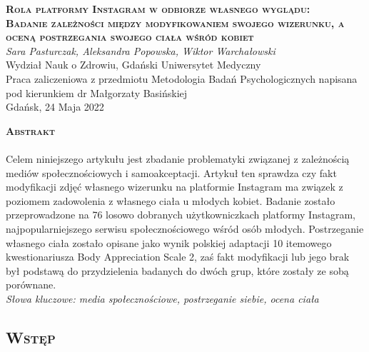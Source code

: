\documentclass[12pt,a4paper,final,oneside,onecolumn,titlepage]{article}
\begin{document}
\pagestyle{fancy}
\fancyhead{}
\fancyfoot{}
\rhead{\thepage}

\begin{titlepage}
  \thispagestyle{empty}
  \rhead{\thepage}
  \begin{center}
  \vspace*{1cm}
  \Large
  \textbf{\textsc{Rola platformy Instagram w odbiorze własnego wyglądu:\\ Badanie zależności między modyfikowaniem swojego wizerunku, a oceną postrzegania swojego ciała wśród kobiet\\}}
  \vspace{1.5cm}
  \textit{Sara Pasturczak, Aleksandra Popowska, Wiktor Warchałowski\\}
  Wydział Nauk o Zdrowiu, Gdański Uniwersytet Medyczny\\
  \vspace{3cm}
  Praca zaliczeniowa z przedmiotu Metodologia Badań Psychologicznych napisana pod kierunkiem dr Małgorzaty Basińskiej\\
  \vspace{3cm}
  Gdańsk, 24 Maja 2022
  \end{center}
\end{titlepage}
\begin{center}
  \vspace*{0.5cm}
  \large{\textbf{\textsc{Abstrakt}}}
\end{center}
\paragraph{}
Celem niniejszego artykułu jest zbadanie problematyki związanej z zależnością mediów społecznościowych i samoakceptacji. Artykuł ten sprawdza czy fakt modyfikacji zdjęć własnego wizerunku na platformie Instagram ma związek z poziomem zadowolenia z własnego ciała u młodych kobiet. Badanie zostało przeprowadzone na 76 losowo dobranych użytkowniczkach platformy Instagram, najpopularniejszego serwisu społecznościowego wśród osób młodych. Postrzeganie własnego ciała zostało opisane jako wynik polskiej adaptacji 10 itemowego kwestionariusza Body Appreciation Scale 2, zaś fakt modyfikacji lub jego brak był podstawą do przydzielenia badanych do dwóch grup, które zostały ze sobą porównane.\\
\textit{Słowa kluczowe: media społecznościowe, postrzeganie siebie, ocena ciała}
\newpage
\begin{center}
\section*{\large{\textbf{\textsc{Wstęp}}}}
\end{center}
\end{document}
